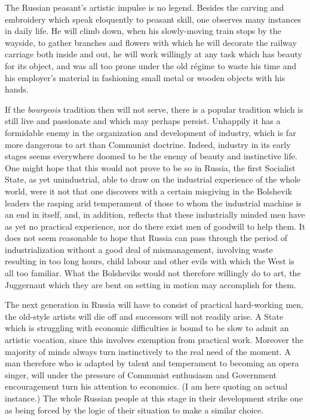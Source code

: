 The Russian peasant's artistic impulse is no legend. Besides the carving and embroidery which speak eloquently to peasant skill, one observes many instances in daily life. He will climb down, when his slowly-moving train stops by the wayside, to gather branches and flowers with which he will decorate the railway carriage both inside and out, he will work willingly at any task which has beauty for its object, and was all too prone under the old régime to waste his time and his employer's material in fashioning small metal or wooden objects with his hands.

If the \emph{bourgeois} tradition then will not serve, there is a popular tradition which is still live and passionate and which may perhaps persist. Unhappily it has a formidable enemy in the organization and development of industry, which is far more dangerous to art than Communist doctrine. Indeed, industry in its early stages seems everywhere doomed to be the enemy of beauty and instinctive life. One might hope that this would not prove to be so in Russia, the first Socialist State, as yet unindustrial, able to draw on the industrial experience of the whole world, were it not that one discovers with a certain misgiving in the Bolshevik leaders the rasping arid temperament of those to whom the industrial machine is an end in itself, and, in addition, reflects that these industrially minded men have as yet no practical experience, nor do there exist men of goodwill to help them. It does not seem reasonable to hope that Russia can pass through the period of industrialization without a good deal of mismanagement, involving waste resulting in too long hours, child labour and other evils with which the West is all too familiar. What the Bolsheviks would not therefore willingly do to art, the Juggernaut which they are bent on setting in motion may accomplish for them.

The next generation in Russia will have to consist of practical hard-working men, the old-style artists will die off and successors will not readily arise. A State which is struggling with economic difficulties is bound to be slow to admit an artistic vocation, since this involves exemption from practical work. Moreover the majority of minds always turn instinctively to the real need of the moment. A man therefore who is adapted by talent and temperament to becoming an opera singer, will under the pressure of Communist enthusiasm and Government encouragement turn his attention to economics. (I am here quoting an actual instance.) The whole Russian people at this stage in their development strike one as being forced by the logic of their situation to make a similar choice.

